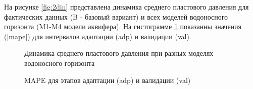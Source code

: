 \documentclass{article}
\begin{document}
На рисунке \ref{fig:2din} представлена динамика среднего пластового давления для фактических данных (B - базовый вариант) и всех моделей водоносного горизонта (M1-M4 модели аквифера). На гистограмме \ref{fig:hist} показанны значения (\ref{mape}) для интервалов адаптации (adp) и валидации (val).
\begin{figure} 
    \begin{minipage}[h]{0.48\linewidth}
      \caption{Динамика среднего пластового давления при разных моделях водоносного горизонта}
      \label{fig:din}
    \end{minipage} \hfill
    \begin{minipage}[h]{0.48\linewidth}
      \caption{MAPE для этапов адаптации (adp) и валидации (val)}
      \label{fig:hist}
    \end{minipage} 
\end{figure}
\end{document}

